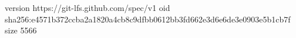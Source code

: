 version https://git-lfs.github.com/spec/v1
oid sha256:e4571b372ccba2a1820a4cb8c9dfbb0612bb3fd662e3d6e6de3e0903e5b1cb7f
size 5566
